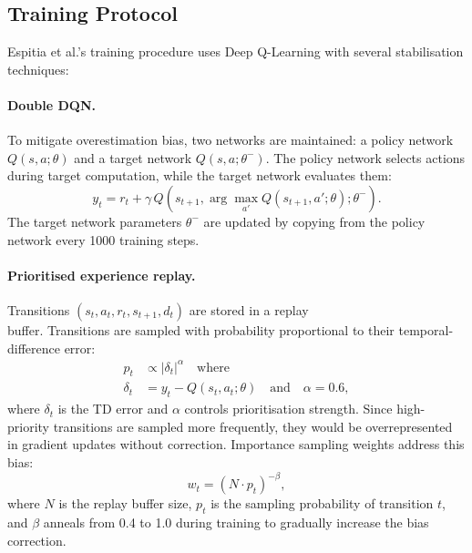 \documentclass[12pt, oneside, openany]{book}
\theoremstyle{plain}
\theoremstyle{definition}
\begin{document}
\subsection{Training Protocol}

Espitia et al.'s training procedure uses Deep Q-Learning with several stabilisation techniques:

\paragraph{Double DQN.} To mitigate overestimation bias, two networks are maintained: a policy network $Q(s,a; \theta)$ and a target network $Q(s,a; \theta^-)$. The policy network selects actions during target computation, while the target network evaluates them:
\begin{equation}
y_t = r_t + \gamma \, Q(s_{t+1}, \arg\max_{a'} Q(s_{t+1}, a'; \theta) ; \theta^-).
\end{equation}
The target network parameters $\theta^-$ are updated by copying from the policy network every 1000 training steps.

\paragraph{Prioritised experience replay.} Transitions $(s_t, a_t, r_t, s_{t+1}, d_t)$ are stored in a replay \\buffer.
Transitions are sampled with probability proportional to their temporal-difference error:
\begin{align}
p_t &\propto |\delta_t|^\alpha \quad \text{where} \\
\delta_t &= y_t - Q(s_t, a_t; \theta) \quad \text{and} \quad \alpha = 0.6,
\end{align}
where $\delta_t$ is the TD error and $\alpha$ controls prioritisation strength. Since high-priority transitions are sampled more frequently, they would be overrepresented in gradient updates without correction. Importance sampling weights address this bias:
\begin{equation}
w_t = (N \cdot p_t)^{-\beta},
\end{equation}
where $N$ is the replay buffer size, $p_t$ is the sampling probability of transition $t$, and $\beta$ anneals from 0.4 to 1.0 during training to gradually increase the bias correction.
\end{document}
